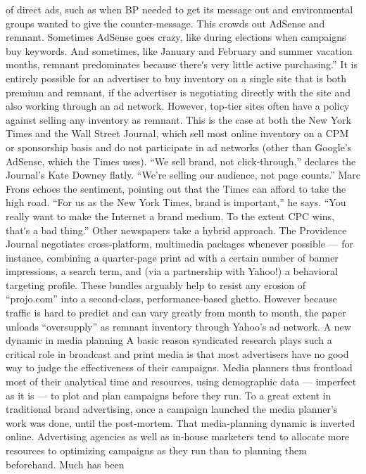 of direct ads, such as when BP needed to get its message out and
environmental groups wanted to give the counter‐message. This crowds
out AdSense and remnant. Sometimes AdSense goes crazy, like during
elections when campaigns buy keywords. And sometimes, like January
and February and summer vacation months, remnant predominates
because thereʹs very little active purchasing.''
It is entirely possible for an advertiser to buy inventory on a single site
that is both premium and remnant, if the advertiser is negotiating directly
with the site and also working through an ad network. However, top‐tier
sites often have a policy against selling any inventory as remnant.
This is the case at both the New York Times and the Wall Street Journal,
which sell most online inventory on a CPM or sponsorship basis and do
not participate in ad networks (other than Google’s AdSense, which the
Times uses). ``We sell brand, not click‐through,'' declares the Journal’s Kate
Downey flatly. ``We’re selling our audience, not page counts.''
Marc Frons echoes the sentiment, pointing out that the Times can afford to
take the high road. ``For us as the New York Times, brand is important,'' he
says. ``You really want to make the Internet a brand medium. To the
extent CPC wins, thatʹs a bad thing.''
Other newspapers take a hybrid approach. The Providence Journal
negotiates cross‐platform, multimedia packages whenever possible — for
instance, combining a quarter‐page print ad with a certain number of
banner impressions, a search term, and (via a partnership with Yahoo!) a
behavioral targeting profile. These bundles arguably help to resist any
erosion of ``projo.com'' into a second‐class, performance‐based ghetto.
However because traffic is hard to predict and can vary greatly from
month to month, the paper unloads ``oversupply'' as remnant inventory
through Yahoo’s ad network.
A new dynamic in media planning
A basic reason syndicated research plays such a critical role in broadcast
and print media is that most advertisers have no good way to judge the
effectiveness of their campaigns. Media planners thus frontload most of
their analytical time and resources, using demographic data — imperfect
as it is — to plot and plan campaigns before they run. To a great extent in
traditional brand advertising, once a campaign launched the media
planner’s work was done, until the post‐mortem.
That media‐planning dynamic is inverted online. Advertising agencies as
well as in‐house marketers tend to allocate more resources to optimizing
campaigns as they run than to planning them beforehand. Much has been
